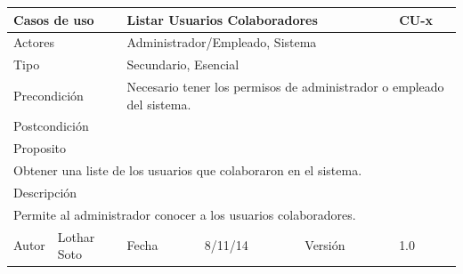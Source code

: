 \documentclass{article}
\begin{document}
\begin{table}[h]
\begin{tabular}{|l|l|l|l|l|l|}
\hline
\multicolumn{2}{|p{2cm}|}{Casos de uso}  & \multicolumn{3}{p{7cm}|}{Listar Usuarios Colaboradores} & CU-x \\
\hline
\multicolumn{2}{|p{2cm}|}{Actores}       & \multicolumn{4}{p{8cm}|}{Administrador/Empleado, Sistema}        \\
\hline
\multicolumn{2}{|p{2cm}|}{Tipo}          & \multicolumn{4}{p{8cm}|}{Secundario, Esencial}        \\
\hline
\multicolumn{2}{|p{2cm}|}{Precondición}  & \multicolumn{4}{p{8cm}|}{Necesario tener los permisos de administrador o empleado del sistema.}        \\
\hline
\multicolumn{2}{|p{2cm}|}{Postcondición} & \multicolumn{4}{p{8cm}|}{}        \\
\hline
\multicolumn{6}{|p{10cm}|}{Proposito}                                   \\
\hline
\multicolumn{6}{|p{10cm}|}{Obtener una liste de los usuarios que colaboraron en el sistema.}                                            \\
\hline
\multicolumn{6}{|p{10cm}|}{Descripción}                                 \\
\hline
\multicolumn{6}{|p{10cm}|}{Permite al administrador conocer a los usuarios colaboradores.}                                            \\
\hline
Autor          &       Lothar Soto        & Fecha    &  8/11/14   &   Versión  & 1.0\\    
\hline
\end{tabular}
\end{table}
\end{document}
